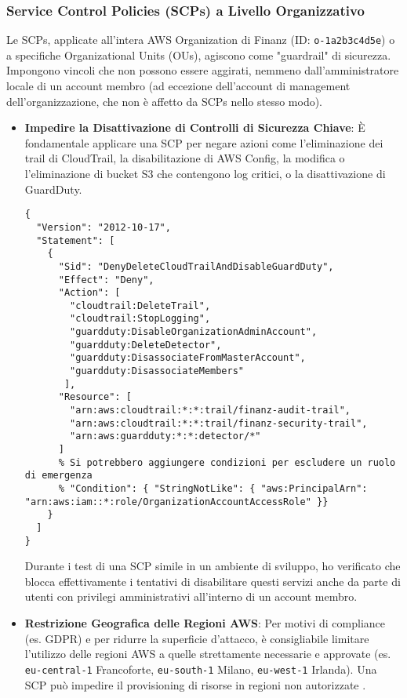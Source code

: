 \subsubsection{Service Control Policies (SCPs) a Livello Organizzativo}
Le SCPs, applicate all'intera AWS Organization di Finanz (ID: \texttt{o-1a2b3c4d5e}) o a specifiche Organizational Units (OUs), agiscono come "guardrail" di sicurezza. Impongono vincoli che non possono essere aggirati, nemmeno dall'amministratore locale di un account membro (ad eccezione dell'account di management dell'organizzazione, che non è affetto da SCPs nello stesso modo).
\begin{itemize}
    \item \textbf{Impedire la Disattivazione di Controlli di Sicurezza Chiave}: È fondamentale applicare una SCP per negare azioni come l'eliminazione dei trail di CloudTrail, la disabilitazione di AWS Config, la modifica o l'eliminazione di bucket S3 che contengono log critici, o la disattivazione di GuardDuty.
    \begin{lstlisting}[style=json, caption={SCP per prevenire l'eliminazione di CloudTrail e la disattivazione di GuardDuty}, label=lst:scp-deny-security-controls-disable]
{
  "Version": "2012-10-17",
  "Statement": [
    {
      "Sid": "DenyDeleteCloudTrailAndDisableGuardDuty",
      "Effect": "Deny",
      "Action": [
        "cloudtrail:DeleteTrail",
        "cloudtrail:StopLogging",
        "guardduty:DisableOrganizationAdminAccount",
        "guardduty:DeleteDetector",
        "guardduty:DisassociateFromMasterAccount",
        "guardduty:DisassociateMembers"
       ],
      "Resource": [
        "arn:aws:cloudtrail:*:*:trail/finanz-audit-trail", 
        "arn:aws:cloudtrail:*:*:trail/finanz-security-trail", 
        "arn:aws:guardduty:*:*:detector/*"
      ]
      % Si potrebbero aggiungere condizioni per escludere un ruolo di emergenza
      % "Condition": { "StringNotLike": { "aws:PrincipalArn": "arn:aws:iam::*:role/OrganizationAccountAccessRole" }}
    }
  ]
}
    \end{lstlisting}
    Durante i test di una SCP simile in un ambiente di sviluppo, ho verificato che blocca effettivamente i tentativi di disabilitare questi servizi anche da parte di utenti con privilegi amministrativi all'interno di un account membro.
    \item \textbf{Restrizione Geografica delle Regioni AWS}: Per motivi di compliance (es. GDPR) e per ridurre la superficie d'attacco, è consigliabile limitare l'utilizzo delle regioni AWS a quelle strettamente necessarie e approvate (es. \texttt{eu-central-1} Francoforte, \texttt{eu-south-1} Milano, \texttt{eu-west-1} Irlanda). Una SCP può impedire il provisioning di risorse in regioni non autorizzate \cite{awsbuilders:scps}.

\end{itemize}
